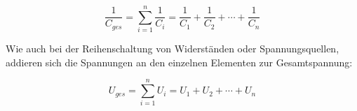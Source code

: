 \begin{equation}
	\frac{1}{C_{ges}} = \sum\limits_{i=1}^n \frac{1}{C_i} = \frac{1}{C_1} + \frac{1}{C_2} + \cdots + \frac{1}{C_n}
\end{equation}

\noindent Wie auch bei der Reihenschaltung von Widerständen oder Spannungsquellen, addieren sich die Spannungen an den einzelnen Elementen zur Gesamtspannung:

\begin{equation}
	U_{ges} = \sum\limits_{i=1}^n U_i = U_1 + U_2 + \cdots + U_n
\end{equation}

